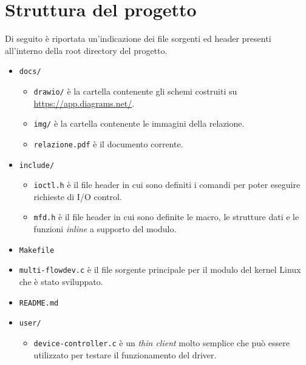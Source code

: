 \documentclass{article}
\begin{document}
\section{Struttura del progetto}
Di seguito è riportata un'indicazione dei file sorgenti ed header presenti all'interno della root directory del progetto.
\begin{itemize}
\item \texttt{docs/}
\begin{itemize}
\item \texttt{drawio/} è la cartella contenente gli schemi costruiti su \url{https://app.diagrams.net/}.
\item \texttt{img/} è la cartella contenente le immagini della relazione.
\item \texttt{relazione.pdf} è il documento corrente.
\end{itemize}
\item \texttt{include/}
\begin{itemize}
\item \texttt{ioctl.h} è il file header in cui sono definiti i comandi per poter eseguire richieste di I/O control.
\item \texttt{mfd.h} è il file header in cui sono definite le macro, le strutture dati e le funzioni \textsl{inline} a supporto del modulo.
\end{itemize}
\item \texttt{Makefile}
\item \texttt{multi-flowdev.c} è il file sorgente principale per il modulo del kernel Linux che è stato sviluppato.
\item \texttt{README.md}
\item \texttt{user/}
\begin{itemize}
\item \texttt{device-controller.c} è un \textsl{thin client} molto semplice che può essere utilizzato per testare il funzionamento del driver.
\end{itemize}
\end{itemize}
\end{document}
